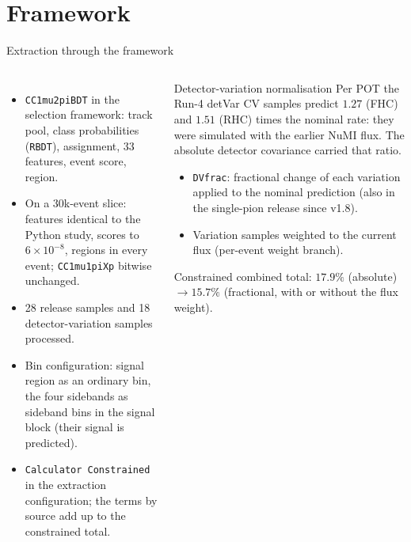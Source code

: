 \documentclass[aspectratio=169,10pt]{beamer}
\begin{document}
\section{Framework}

\begin{frame}{Extraction through the framework}
  \begin{columns}[T]
  \begin{itemize}\footnotesize\setlength\itemsep{2pt}
    \item \texttt{CC1mu2piBDT} in the selection framework: track pool, class probabilities (\texttt{RBDT}),
          assignment, 33 features, event score, region.
    \item On a $30$k-event slice: features identical to the Python study, scores to $6\times10^{-8}$,
          regions in every event; \texttt{CC1mu1piXp} bitwise unchanged.
    \item 28 release samples and 18 detector-variation samples processed.
    \item Bin configuration: signal region as an ordinary bin, the four sidebands as sideband bins in the
          signal block (their signal is predicted).
    \item \texttt{Calculator Constrained} in the extraction configuration; the terms by source add up to the
          constrained total.
  \end{itemize}
  \begin{block}{\small Detector-variation normalisation}\footnotesize
    Per POT the Run-4 detVar CV samples predict $1.27$ (FHC) and $1.51$ (RHC) times the nominal rate:
    they were simulated with the earlier NuMI flux. The absolute detector covariance carried that ratio.
    \begin{itemize}\footnotesize
      \item \texttt{DVfrac}: fractional change of each variation applied to the nominal prediction
            (also in the single-pion release since v1.8).
      \item Variation samples weighted to the current flux (per-event weight branch).
    \end{itemize}
    Constrained combined total: $17.9\%$ (absolute) $\to15.7\%$ (fractional, with or without the flux weight).
  \end{block}
  \end{columns}
\end{frame}
\end{document}
